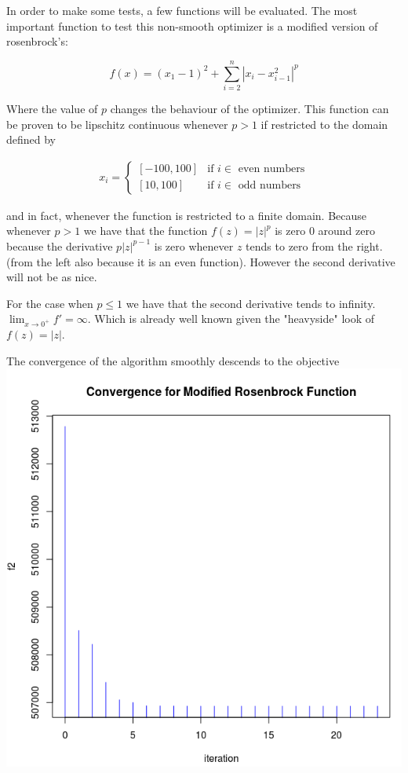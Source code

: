 In order to make some tests, a few functions will be evaluated. The most important function to test this non-smooth optimizer is a modified version of rosenbrock's:

\begin{equation}
    f(x) = (x_1 - 1)^2 + \sum_{i = 2}^n |x_i - x_{i - 1}^2|^p
\end{equation}

Where the value of $p$ changes the behaviour of the optimizer. This function can be proven to be lipschitz continuous whenever $p > 1$ if restricted to the domain defined by 

\begin{equation}
  \begin{aligned}
    x_i = 
    \begin{cases}
      [-100, 100] & \text{if } i \in \text{ even numbers} \\
      [10, 100] & \text{if } i \in \text{ odd numbers}
    \end{cases}
  \end{aligned}
\end{equation}

and in fact, whenever the function is restricted to a finite domain. Because whenever $p > 1$ we have that the function $f(z) = |z|^p$ is zero $0$ around zero because the derivative $p |z| ^{p-1}$ is zero whenever $z$ tends to zero from the right. (from the left also because it is an even function). However the second derivative will not be as nice.

For the case when $p \leq 1$ we have that the second derivative tends to infinity. $\displaystyle \lim_{x \to 0^+} {f' = \infty}$. Which is already well known given the "heavyside" look of $f(z) = |z|$.

The convergence of the algorithm smoothly descends to the objective 
\centering
\includegraphics[scale=0.3]{Figures/convergence.png}

